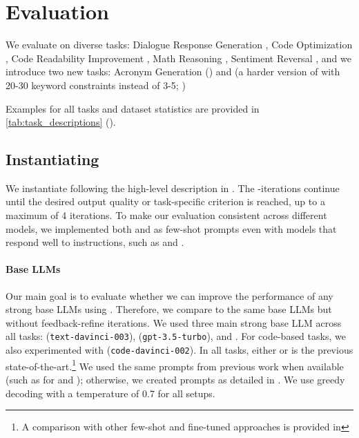 

 






\section{Evaluation}
\label{sec:exps}

We evaluate \ours on \numtasks diverse tasks: 
Dialogue Response Generation \citep[; ][]{mehri-eskenazi-2020-unsupervised}, 
Code Optimization \citep[; ][]{pie}, 
Code Readability Improvement \citep[; ][]{puri2021codenet}, 
Math Reasoning \citep[; ][]{cobbe2021training}, 
Sentiment Reversal \citep[; ][]{zhang2015character}, 
and we introduce two new tasks: Acronym Generation () and 
\commongenhard (a harder version of \citet{lin2019commongen} with 20-30 keyword constraints instead of 3-5; )

Examples for all tasks and dataset statistics are provided in \autoref{tab:task_descriptions} (). 

\subsection{Instantiating \ours} %
\label{ssec:instantiation}
We instantiate \ours following the high-level description in . %
The \fbmod-\itermod iterations continue until the desired output quality or task-specific criterion is reached, 
up to a maximum of 4 iterations.
To make our evaluation consistent across different models, we implemented both \fbmod and \itermod as few-shot prompts even with models that respond well to instructions, such as \chatgpt and \gptf. 


\paragraph{Base LLMs} 
Our main goal is to evaluate whether we can improve the performance of any strong base LLMs using \ours. 
Therefore, we compare \ours to the same base LLMs but without feedback-refine iterations.
We used three main strong base LLM across all tasks: 
\gptt (\texttt{text-davinci-003}), \chatgpt (\texttt{gpt-3.5-turbo}), and \gptf \citep{openai2023gpt4}.
For code-based tasks, we also experimented with \codex (\texttt{code-davinci-002}).
In all tasks, either \gptt or \gptf is the previous state-of-the-art.\footnote{A comparison with other few-shot and fine-tuned approaches is provided in }
We used the same prompts from previous work when available (such as for \codeopt and \gsm); otherwise, we created  prompts as detailed in .
We use greedy decoding with a temperature of 0.7 for all setups.    












